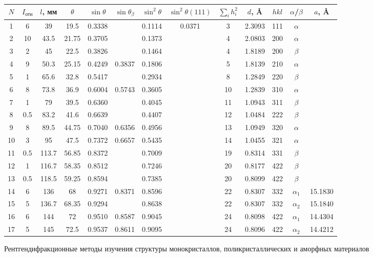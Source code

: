 \documentclass[a4paper, 12pt]{article}
\begin{document}
\begin{table}[H]
	\centering
	\begin{tabular}{|c|c|c|c|c|c|c|c|c|c|c|c|c|}
		\hline
		$N$ & $I_\text{отн}$ & $l$, мм & $\theta$ & $\sin\theta$ & $\sin\theta_\beta$ & $\sin^2\theta$ & $\sin^2\theta (111) $ & $\sum\limits_i h_i^2$ & $d$, \AA & $hkl$ & $\alpha$/$\beta$ & $a$, \AA \\
		\hline
		1 & 6 & 39 & 19.5 & 0.3338 & & 0.1114 & 0.0371 & 3 & 2.3093 & 111 & $\alpha$ &   \\
		\hline
		2 & 10 & 43.5 & 21.75 & 0.3705 & & 0.1373 &  & 4 & 2.0803 & 200 & $\alpha$ &   \\
		\hline
		3 & 2 & 45 & 22.5 & 0.3826 & & 0.1464 &  & 4 & 1.8189 & 200 & $\beta$ &   \\
		\hline
		4 & 9 & 50.3 & 25.15 & 0.4249 & 0.3837 & 0.1806 &  & 5 & 1.8139 & 210 & $\alpha$ &   \\
		\hline
		5 & 1 & 65.6 & 32.8 & 0.5417 & & 0.2934 &  & 8 & 1.2849 & 220 & $\beta$ &   \\
		\hline
		6 & 8 & 73.8 & 36.9 & 0.6004 & 0.5743 & 0.3605 &  & 10 & 1.2839 & 310 & $\alpha$ &   \\
		\hline
		7 & 1 & 79 & 39.5 & 0.6360 & & 0.4045 &  & 11 & 1.0943 & 311 & $\beta$ &   \\
		\hline
		8 & 0.5 & 83.2 & 41.6 & 0.6639 & & 0.4407 &  & 12 & 1.0484 & 222 & $\beta$ &   \\
		\hline
		9 & 8 & 89.5 & 44.75 & 0.7040 & 0.6356 & 0.4956 &  & 13 & 1.0949 & 320 & $\alpha$ &   \\
		\hline
		10 & 3 & 95 & 47.5 & 0.7372 & 0.6657 & 0.5435 &  & 14 & 1.0455 & 321 & $\alpha$ &   \\
		\hline
		11 & 0.5 & 113.7 & 56.85 & 0.8372 & & 0.7009 &  & 19 & 0.8314 & 331 & $\beta$ &   \\
		\hline
		12 & 1 & 116.7 & 58.35 & 0.8512 & & 0.7246 &  & 20 & 0.8177 & 422 & $\beta$ &   \\
		\hline
		13 & 0.5 & 118.5 & 59.25 & 0.8594 & & 0.7385 &  & 20 & 0.8099 & 422 & $\beta$ &   \\
		\hline
		14 & 6 & 136 & 68 & 0.9271 & 0.8371 & 0.8596 &   & 22 & 0.8307 & 332 & $\alpha_1$ & 15.1830  \\
		\hline
		15 & 5 & 136.7 & 68.35 & 0.9294 &  & 0.8638 &  & 22 & 0.8307 & 332 & $\alpha_2$ & 15.1840  \\
		\hline
		16 & 6 & 144 & 72 & 0.9510 & 0.8587 & 0.9045 &  & 24 & 0.8098 & 422 & $\alpha_1$ & 14.4304 \\
		\hline
		17 & 5 & 145 & 72.5 & 0.9537 & 0.8611 & 0.9095 &  & 24 & 0.8096 & 422 & $\alpha_2$ & 14.4212  \\
		\hline
	\end{tabular}
\end{table}


\newpage


\begin{thebibliography}{1}
	Рентгендифракционные методы изучения структуры монокристаллов, поликристаллических и аморфных материалов
\end{thebibliography}
\end{document}
